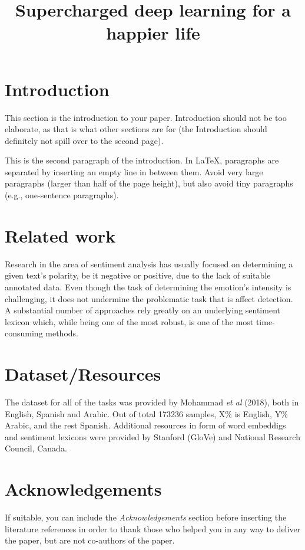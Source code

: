 \documentclass[10pt, a4paper]{article}
\title{Supercharged deep learning for a happier life}
\begin{document}
\maketitleabstract

\section{Introduction}

This section is the introduction to your paper. Introduction should not be too elaborate, as that is what other sections are for (the Introduction should definitely not spill over to the second page). 

This is the second paragraph of the introduction. In \LaTeX , paragraphs are separated by inserting an empty line in between them.  Avoid very large paragraphs (larger than half of the page height), but also avoid tiny paragraphs (e.g., one-sentence paragraphs).

\section{Related work}

Research in the area of sentiment analysis has usually focused on determining a given text's polarity, be it negative or positive, due to the lack of suitable annotated data. Even though the task of determining the emotion's intensity is challenging, it does not undermine the problematic task that is affect detection. A substantial number of approaches rely greatly on an underlying sentiment lexicon which, while being one of the most robust, is one of the most time-consuming methods. 

\section{Dataset/Resources}
The dataset for all of the tasks was provided by Mohammad \emph{et al} (2018), both in English, Spanish and Arabic. Out of total 173236 samples, X\% is English, Y\% Arabic, and the rest Spanish. Additional resources in form of word embeddigs and sentiment lexicons were provided by Stanford (GloVe) and National Research Council, Canada. 

\section*{Acknowledgements}

If suitable, you can include the \textit{Acknowledgements} section before inserting the literature references  in order to thank those who helped you in any way to deliver the paper, but are not co-authors of the paper.


 
\end{document}
